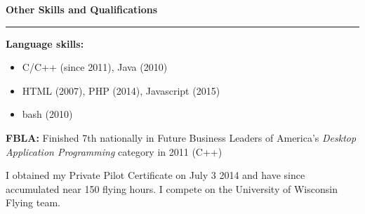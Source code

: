 \documentclass[12pt,letterpaper]{article}
\newenvironment{details}{
    \vspace{-.5em}
    \begin{itemize}
        \renewcommand \labelitemi{\labelitemiv}
        \setlength{\itemsep}{0pt}
        \setlength{\parskip}{-1pt}
        \setlength{\parsep}{0pt}
    }{
    \end{itemize}
    \vspace{-.5em}
}
\newcommand{\hr} {
    \vspace{-1em}
    \par\rule{\textwidth}{1pt}
    \vspace{-1.5em}
}
\newcommand{\ressection}[1] {
    \par{\large \textbf{#1}}
    \hr
}
\newenvironment{other} {
    \ressection{Other Skills and Qualifications}
    \setlength{\parskip}{3pt}
}{
    \vspace{0.5em}
}
\begin{document}
\begin{other}
\par \textbf{Language skills:}%
\begin{details}
    \item C/C++ (since 2011), Java (2010)
    \item HTML (2007), PHP (2014), Javascript (2015)
    \item bash (2010)
\end{details}
\par \textbf{FBLA:} Finished 7th nationally in Future Business Leaders of America's \textit{Desktop Application Programming} category in 2011 (C++)


\par I obtained my Private Pilot Certificate on July 3 2014 and have since accumulated near 150 flying hours.%
    I compete on the University of Wisconsin Flying team.

\end{other}
\end{document}
